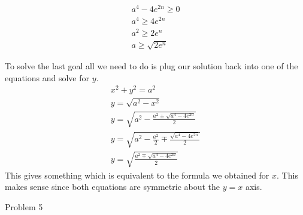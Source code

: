 \documentclass{report}
\begin{document}
\begin{description}
\begin{mdframed}
            \begin{gather}
                a^4 - 4e^{2n} \ge 0\\ 
                a^4 \ge 4e^{2n}\\
                a^2 \ge 2e^n\\
                a \ge \sqrt{2e^n}
            \end{gather}
        \end{mdframed}
        \pagebreak
        \begin{mdframed}
            To solve the last goal all we need to do is plug
            our solution back into one of the equations and solve
            for $y$.
            \begin{gather}
                x^2 + y^2 = a^2\\
                y = \sqrt{a^2-x^2}\\
                y = \sqrt{a^2 - \frac{a^2 \pm \sqrt{a^4 - 4e^{2n}}} {2}}\\
                y = \sqrt{a^2 - \frac{a^2}{2} \mp \frac{\sqrt{a^4-4e^{2n}}}{2}}\\
                y = \sqrt{\frac{a^2 \mp \sqrt{a^4-4e^{2n}}}{2}}
            \end{gather}
            This gives something which is equivalent to the formula
            we obtained for $x$. This makes sense since both equations
            are symmetric about the $y = x$ axis.
        \end{mdframed}
    \item {\large Problem 5}
        \begin{mdframed}
            
        \end{mdframed}
\end{description}
\end{document}
